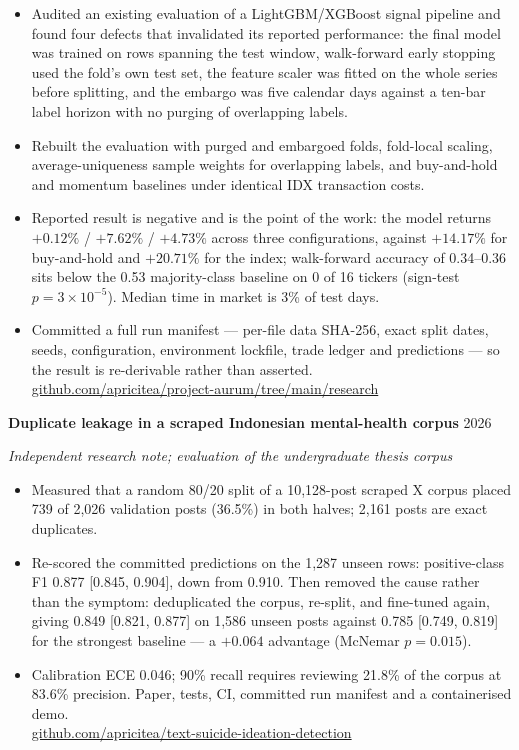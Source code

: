 \documentclass[11pt,a4paper]{article}
\newcommand{\heading}[2]{\textbf{#1} \hfill {\small\color{muted}#2}\par}
\newcommand{\subheading}[1]{\textit{\small #1}\par}
\begin{document}
\begin{itemize}
  \item Audited an existing evaluation of a LightGBM/XGBoost signal pipeline and found four
        defects that invalidated its reported performance: the final model was trained on
        rows spanning the test window, walk-forward early stopping used the fold's own test
        set, the feature scaler was fitted on the whole series before splitting, and the
        embargo was five calendar days against a ten-bar label horizon with no purging of
        overlapping labels.
  \item Rebuilt the evaluation with purged and embargoed folds, fold-local scaling,
        average-uniqueness sample weights for overlapping labels, and buy-and-hold and
        momentum baselines under identical IDX transaction costs.
  \item Reported result is negative and is the point of the work: the model returns
        $+0.12\%$ / $+7.62\%$ / $+4.73\%$ across three configurations, against $+14.17\%$
        for buy-and-hold and $+20.71\%$ for the index; walk-forward accuracy of
        0.34--0.36 sits below the 0.53 majority-class baseline on 0 of 16 tickers
        (sign-test $p=3\times10^{-5}$). Median time in market is 3\% of test days.
  \item Committed a full run manifest --- per-file data SHA-256, exact split dates, seeds,
        configuration, environment lockfile, trade ledger and predictions --- so the result
        is re-derivable rather than asserted.\\
        \href{https://github.com/apricitea/project-aurum/tree/main/research}{github.com/apricitea/project-aurum/tree/main/research}
\end{itemize}

\heading{Duplicate leakage in a scraped Indonesian mental-health corpus}{2026}
\subheading{Independent research note; evaluation of the undergraduate thesis corpus}

\begin{itemize}
  \item Measured that a random 80/20 split of a 10{,}128-post scraped X corpus placed 739 of
        2{,}026 validation posts (36.5\%) in both halves; 2{,}161 posts are exact duplicates.
  \item Re-scored the committed predictions on the 1{,}287 unseen rows: positive-class F1 0.877
        [0.845, 0.904], down from 0.910. Then removed the cause rather than the symptom:
        deduplicated the corpus, re-split, and fine-tuned again, giving 0.849 [0.821, 0.877] on
        1{,}586 unseen posts against 0.785 [0.749, 0.819] for the strongest baseline --- a
        $+0.064$ advantage (McNemar $p=0.015$).
  \item Calibration ECE 0.046; 90\% recall requires reviewing 21.8\% of the corpus at
        83.6\% precision. Paper, tests, CI, committed run manifest and a containerised demo.\\
        \href{https://github.com/apricitea/text-suicide-ideation-detection}{github.com/apricitea/text-suicide-ideation-detection}
\end{itemize}
\end{document}
